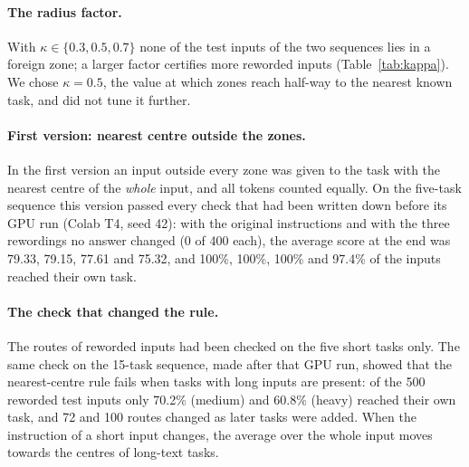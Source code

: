 \paragraph{The radius factor.} With $\kappa \in \{0.3, 0.5, 0.7\}$ none of the test inputs of the
two sequences lies in a foreign zone; a larger factor certifies more reworded inputs
(Table~\ref{tab:kappa}). We chose $\kappa = 0.5$, the value at which zones reach half-way to the
nearest known task, and did not tune it further.

\begin{table}[h]
  \caption{Routes for three radius factors (CPU, T5-base word-vectors, final rule). Entries are
  for the original / light / medium / heavy wording.}
  \label{tab:kappa}
  \centering
  \footnotesize
  \setlength{\tabcolsep}{4pt}
  
\end{table}

\paragraph{First version: nearest centre outside the zones.} In the first version an input outside
every zone was given to the task with the nearest centre of the \emph{whole} input, and all tokens
counted equally. On the five-task sequence this version passed every check that had been written
down before its GPU run (Colab T4, seed 42): with the original instructions and with the three
rewordings no answer changed (0 of 400 each), the average score at the end was 79.33, 79.15, 77.61
and 75.32, and 100\%, 100\%, 100\% and 97.4\% of the inputs reached their own task.

\paragraph{The check that changed the rule.} The routes of reworded inputs had been checked on the
five short tasks only. The same check on the 15-task sequence, made after that GPU run, showed that
the nearest-centre rule fails when tasks with long inputs are present: of the 500 reworded test
inputs only 70.2\% (medium) and 60.8\% (heavy) reached their own task, and 72 and 100 routes changed
as later tasks were added. When the instruction of a short input changes, the average over the whole
input moves towards the centres of long-text tasks.

